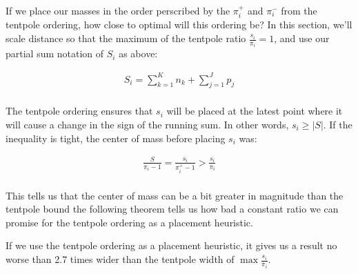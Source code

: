 \documentclass[11pt,twocolumn]{article}
\begin{document}
If we place our masses in the order perscribed by the $\pi^+_i$ and $\pi^-_i$ from the tentpole ordering, how close to optimal will this ordering be? In this section, we'll scale distance so that the maximum of the tentpole ratio $\frac{s_i}{\pi_i} = 1$, and use our partial sum notation of $S_i$ as above:

\begin{align*}
S_i = \sum_{k=1}^{K} n_k + \sum_{j=1}^{J} p_j \\
\end{align*}

The tentpole ordering ensures that $s_i$ will be placed at the latest point where it will cause a change in the sign of the running sum. In other words, $s_i \geq |S|$.  If the inequality is tight, the center of mass before placing $s_i$ was:

\begin{align*}
\frac{S}{\pi_i -1} = \frac{s_i}{\pi^+_i -1} > \frac{s_i}{\pi_i} \\
\end{align*}

This tells us that the center of mass can be a bit greater in magnitude than the tentpole bound the following theorem tells us how bad a constant ratio we can promise for the tentpole ordering as a placement heuristic.

\begin{thm} \label{thm:tentpoleHeuristicBound}
If we use the tentpole ordering as a placement heuristic, it gives us a result no worse than 2.7 times wider than the tentpole width of $\max \frac{s_i}{\pi_i}$.
\end{thm}
\end{document}
